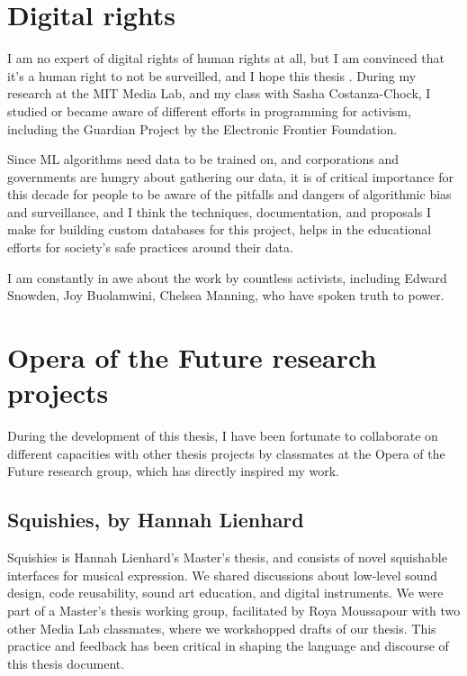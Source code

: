 \section{Digital rights}

I am no expert of digital rights of human rights at all, but I am convinced that it's a human right to not be surveilled, and I hope this thesis . During my research at the MIT Media Lab, and my class with Sasha Costanza-Chock, I studied or became aware of different efforts in programming for activism, including the Guardian Project by the Electronic Frontier Foundation.

Since \acrshort{ML} algorithms need data to be trained on, and corporations and governments are hungry about gathering our data, it is of critical importance for this decade for people to be aware of the pitfalls and dangers of algorithmic bias and surveillance, and I think the techniques, documentation, and proposals I make for building custom databases for this project, helps in the educational efforts for society's safe practices around their data.

I am constantly in awe about the work by countless activists, including Edward Snowden, Joy Buolamwini, Chelsea Manning, who have spoken truth to power.

\section{Opera of the Future research projects}

During the development of this thesis, I have been fortunate to collaborate on different capacities with other thesis projects by classmates at the Opera of the Future research group, which has directly inspired my work.

\subsection{Squishies, by Hannah Lienhard}

Squishies is Hannah Lienhard's Master's thesis, and consists of novel squishable interfaces for musical expression. We shared discussions about low-level sound design, code reusability, sound art education, and digital instruments. We were part of a Master's thesis working group, facilitated by Roya Moussapour with two other Media Lab classmates, where we workshopped drafts of our thesis. This practice and feedback has been critical in shaping the language and discourse of this thesis document.

